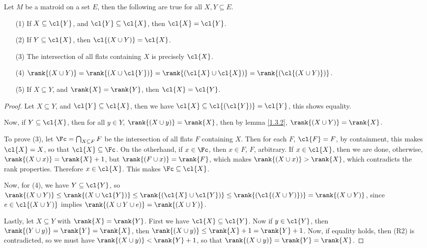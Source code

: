 \begin{lemma}\label{1.4.5}
    Let $M$ be a matroid on a set $E$, then the following are true for all $X,Y
    \subseteq E$.
    \begin{enumerate}
        \item[(1)] If $X \subseteq \cl{Y}$, and $\cl{Y} \subseteq \cl{X}$, then
            $\cl{X}=\cl{Y}$.

        \item[(2)] If $Y \subseteq \cl{X}$, then $\cl{(X \cup Y)}=\cl{X}$.

        \item[(3)] The intersection of all flats containing $X$ is precisely
            $\cl{X}$.

        \item[(4)] $\rank{(X \cup Y)}=\rank{(X \cup \cl{Y})}=\rank{(\cl{X} \cup
            \cl{X})}=\rank{(\cl{(X \cup Y)})}$.

        \item[(5)] If $X \subseteq Y$,  and  $\rank{X}=\rank{Y}$, then
            $\cl{X}=\cl{Y}$.
    \end{enumerate}
\end{lemma}
\begin{proof}
    Let $X \subseteq Y$, and  $\cl{Y} \subseteq \cl{X}$, then we have $\cl{X}
    \subseteq \cl{(\cl{Y})}=\cl{Y}$, this shows equality.

    Now, if $Y \subseteq \cl{X}$, then for all $y \in Y$,  $\rank{(X \cup y)}=
    \rank{X}$, then by lemma \ref{1.3.2}, $\rank{(X \cup Y)}=\rank{X}$.

    To prove (3), let $\Fc=\bigcap_{X \subseteq F}{F}$ be the intersection of
    all flats $F$ containing  $X$. Then for each  $F$,  $\cl{F}=F$, by
    containment, this makes $\cl{X}=X$, so that $\cl{X} \subseteq \Fc$. On the
    otherhand, if $x \in \Fc$, then  $x \in F$, $F$, arbitrary. If $x \in \cl{X}$,
    then we are done, otherwise, $\rank{(X \cup x)}=\rank{X}+1$, but $\rank{(F
    \cup x)}=\rank{F}$, which makes $\rank{(X \cup x)}>\rank{X}$, which
    contradicts the rank properties. Therefore $x \in \cl{X}$. This makes $\Fc
    \subseteq \cl{X}$.

    Now, for (4), we have $Y \subseteq \cl{Y}$, so $\rank{(X \cup Y)} \leq
    \rank{(X \cup \cl{Y})} \leq \rank{(\cl{X} \cup \cl{Y})} \leq \rank{(\cl{(X
    \cup Y)})}=\rank{(X \cup Y)}$, since $e \in \cl{(X \cup Y)}$ implies
    $\rank{(X \cup Y \cup e)}=\rank{(X \cup Y)}$.

    Lastly, let $X \subseteq Y$ with  $\rank{X}=\rank{Y}$. First we have $\cl{X}
    \subseteq \cl{Y}$. Now if $y \in \cl{Y}$, then $\rank{(Y \cup
    y)}=\rank{Y}=\rank{X}$, then $\rank{(X \cup y)} \leq \rank{X}+1=\rank{Y}+1$.
    Now, if equality holds, then (R2) is contradicted, so we must have $\rank{(X
    \cup y)}<\rank{Y}+1$, so that $\rank{(X \cup y)}=\rank{Y}=\rank{X}$.
\end{proof}

